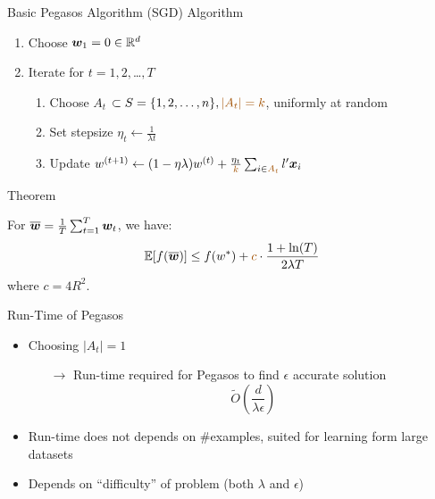 \begin{frame}{Basic Pegasos Algorithm (SGD)}
    {\color{blue} Algorithm}

    \begin{enumerate} 
        \item Choose $\bm{w}_1 = 0 \in \mathbb{R}^d$
        \item Iterate for $t = 1,2,$\ldots$,T$
        \begin{enumerate}
            \item Choose {\color{red} $A_t$} $\subset S = \{1,2,\ldots,n\},{\color{red}|A_t|=k}$, uniformly at random
            \item Set stepsize $\eta_t \leftarrow \frac{1}{\lambda t}$
            \item Update $w^{(t+1)} \leftarrow (1-\eta\lambda)w^{(t)} + \frac{\eta_t}{\color{red}k} \sum_{i\in {\color{red} A_t}} l' \xv_i$
        \end{enumerate}
    \end{enumerate}

    {\color{blue} Theorem}

    For $\overline{\bm{w}} = \frac1T \sum_{t=1}^T \bm{w}_t $, we have:
    \[
         \E[f(\overline{\wv})]\le f(w^*) + {\color{red} c} \cdot \frac{1+\ln(T)}{2\lambda T}
    \]
    where $c=4R^2$.
\end{frame}

\begin{frame}{Run-Time of Pegasos}
    \begin{itemize}
        \item Choosing $|A_t|=1$%
            \begin{itemize}
                \item[$\rightarrow$] Run-time required for Pegasos to find $\epsilon$ accurate solution %
            \[
                \tilde{O}(\frac{d}{\lambda \epsilon})
            \]
            \end{itemize}
        \item Run-time does not depends on \#examples, suited for learning form large datasets
        \item Depends on ``difficulty'' of problem (both $\lambda$ and $\epsilon$)
    \end{itemize}
\end{frame}

